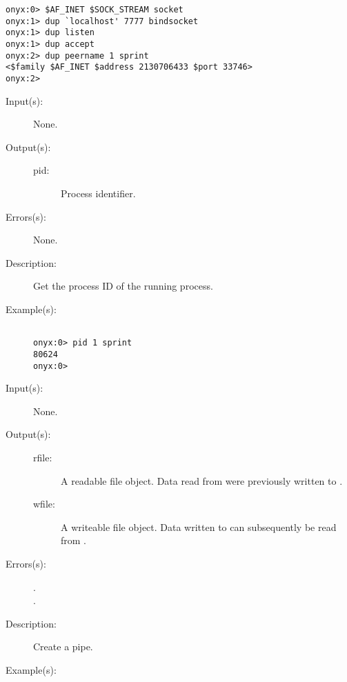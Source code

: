 \begin{description}
\begin{description}
\begin{verbatim}
onyx:0> $AF_INET $SOCK_STREAM socket
onyx:1> dup `localhost' 7777 bindsocket
onyx:1> dup listen
onyx:1> dup accept
onyx:2> dup peername 1 sprint
<$family $AF_INET $address 2130706433 $port 33746>
onyx:2>
		\end{verbatim}
	\end{description}
\label{systemdict:pid}
\item[{\onyxop{--}{pid}{pid}}: ]
	\begin{description}\item[]
	\item[Input(s): ] None.
	\item[Output(s): ]
		\begin{description}\item[]
		\item[pid: ]
			Process identifier.
		\end{description}
	\item[Errors(s): ] None.
	\item[Description: ]
		Get the process ID of the running process.
	\item[Example(s): ]\begin{verbatim}

onyx:0> pid 1 sprint
80624
onyx:0>
		\end{verbatim}
	\end{description}
\label{systemdict:pipe}
\item[{\onyxop{--}{pipe}{rfile wfile}}: ]
	\begin{description}\item[]
	\item[Input(s): ] None.
	\item[Output(s): ]
		\begin{description}\item[]
		\item[rfile: ]
			A readable file object.  Data read from 
			were previously written to .
		\item[wfile: ]
			A writeable file object.  Data written to 
			can subsequently be read from .
		\end{description}
	\item[Errors(s): ]
		\begin{description}\item[]
		\item[.]
		\item[.]
		\end{description}
	\item[Description: ]
		Create a pipe.
	\item[Example(s): ]\begin{verbatim}


\end{verbatim}
\end{description}
\end{description}
